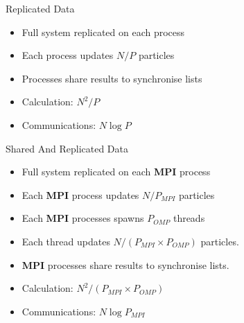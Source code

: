 \documentclass[xcolor={usenames, svgnames}]{beamer}
\begin{document}
\begin{frame}{Replicated Data}
    \rdpic{}

    \begin{itemize}
        \item Full system replicated on each process
        \item Each process updates $N/P$ particles
        \item Processes share results to synchronise lists
        \item Calculation: $N^2/P$
        \item Communications: $N\log{P}$
    \end{itemize}
\end{frame}


\begin{frame}{Shared And Replicated Data}
    \rdpic{}

    \begin{itemize}
        \item Full system replicated on each {\bf MPI} process
        \item Each {\bf MPI} process updates $N/P_{MPI}$ particles
        \item Each {\bf MPI} processes spawns $P_{OMP}$ {\bf \openmp} threads
        \item Each {\bf \openmp{}} thread updates
            $N/(P_{MPI}\times{}P_{OMP})$ particles.
        \item {\bf MPI} processes share results to synchronise lists.
        \item Calculation: $N^2/(P_{MPI}\times{}P_{OMP})$
        \item Communications: $N\log{P_{MPI}}$
    \end{itemize}
\end{frame}
\end{document}
